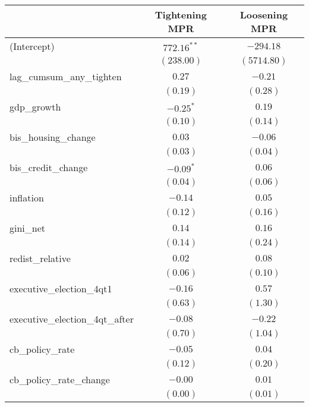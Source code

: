 
\begin{tabular}{l c c }
\hline
 & Tightening MPR & Loosening MPR \\
\hline
(Intercept)                     & $772.16^{**}$ & $-294.18$   \\
                                & $(238.00)$    & $(5714.80)$ \\
lag\_cumsum\_any\_tighten       & $0.27$        & $-0.21$     \\
                                & $(0.19)$      & $(0.28)$    \\
gdp\_growth                     & $-0.25^{*}$   & $0.19$      \\
                                & $(0.10)$      & $(0.14)$    \\
bis\_housing\_change            & $0.03$        & $-0.06$     \\
                                & $(0.03)$      & $(0.04)$    \\
bis\_credit\_change             & $-0.09^{*}$   & $0.06$      \\
                                & $(0.04)$      & $(0.06)$    \\
inflation                       & $-0.14$       & $0.05$      \\
                                & $(0.12)$      & $(0.16)$    \\
gini\_net                       & $0.14$        & $0.16$      \\
                                & $(0.14)$      & $(0.24)$    \\
redist\_relative                & $0.02$        & $0.08$      \\
                                & $(0.06)$      & $(0.10)$    \\
executive\_election\_4qt1       & $-0.16$       & $0.57$      \\
                                & $(0.63)$      & $(1.30)$    \\
executive\_election\_4qt\_after & $-0.08$       & $-0.22$     \\
                                & $(0.70)$      & $(1.04)$    \\
cb\_policy\_rate                & $-0.05$       & $0.04$      \\
                                & $(0.12)$      & $(0.20)$    \\
cb\_policy\_rate\_change        & $-0.00$       & $0.01$      \\
                                & $(0.00)$      & $(0.01)$    \\

\end{tabular}
